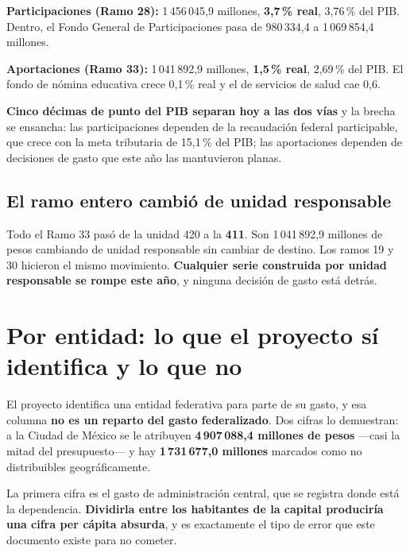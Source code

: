 \begin{list}{}{\setlength{\leftmargin}{1.4em}\setlength{\itemsep}{2pt}}
\item[$\bullet$] \textbf{Participaciones (Ramo 28):} 1\,456\,045,9 millones, \textbf{3,7\,\%
real}, 3,76\,\% del PIB. Dentro, el Fondo General de Participaciones pasa de 980\,334,4 a
1\,069\,854,4 millones.
\item[$\bullet$] \textbf{Aportaciones (Ramo 33):} 1\,041\,892,9 millones, \textbf{1,5\,\%
real}, 2,69\,\% del PIB. El fondo de nómina educativa crece 0,1\,\% real y el de servicios de
salud cae 0,6.
\end{list}

\textbf{Cinco décimas de punto del PIB separan hoy a las dos vías} y la brecha se ensancha:
las participaciones dependen de la recaudación federal participable, que crece con la meta
tributaria de 15,1\,\% del PIB; las aportaciones dependen de decisiones de gasto que este año
las mantuvieron planas.

\subsection{El ramo entero cambió de unidad responsable}

Todo el Ramo 33 pasó de la unidad 420 a la \textbf{411}. Son 1\,041\,892,9 millones de pesos
cambiando de unidad responsable sin cambiar de destino. Los ramos 19 y 30 hicieron el mismo
movimiento. \textbf{Cualquier serie construida por unidad responsable se rompe este año}, y
ninguna decisión de gasto está detrás.

\section{Por entidad: lo que el proyecto sí identifica y lo que no}

El proyecto identifica una entidad federativa para parte de su gasto, y esa columna
\textbf{no es un reparto del gasto federalizado}. Dos cifras lo demuestran: a la Ciudad de
México se le atribuyen \textbf{4\,907\,088,4 millones de pesos} ---casi la mitad del
presupuesto--- y hay \textbf{1\,731\,677,0 millones} marcados como no distribuibles
geográficamente.

La primera cifra es el gasto de administración central, que se registra donde está la
dependencia. \textbf{Dividirla entre los habitantes de la capital produciría una cifra per
cápita absurda}, y es exactamente el tipo de error que este documento existe para no cometer.


